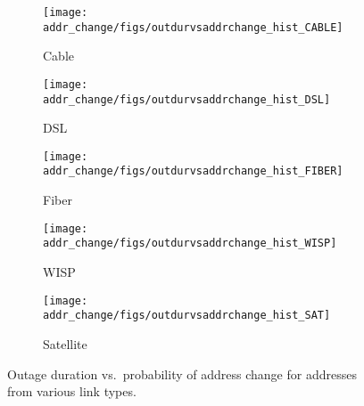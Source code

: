 
\begin{figure*}[t]

\begin{subfigure}[t]{0.19\linewidth}
\centering
\texttt{[image: addr\_change/figs/outdurvsaddrchange\_hist\_CABLE]}
\caption{
\label{fig:outdur_vs_addrchange_cable}
Cable}
\end{subfigure}
%
%
\begin{subfigure}[t]{0.19\linewidth}
\centering
\texttt{[image: addr\_change/figs/outdurvsaddrchange\_hist\_DSL]}
\caption{
\label{fig:outdur_vs_addrchange_dsl}
DSL}
\end{subfigure}
%
%
\begin{subfigure}[t]{0.19\linewidth}
\centering
\texttt{[image: addr\_change/figs/outdurvsaddrchange\_hist\_FIBER]}
\caption{
\label{fig:outdur_vs_addrchange_fiber}
Fiber}
\end{subfigure}
%
%
\begin{subfigure}[t]{0.19\linewidth}
\centering
\texttt{[image: addr\_change/figs/outdurvsaddrchange\_hist\_WISP]}
\caption{
\label{fig:outdur_vs_addrchange_wisp}
WISP}
\end{subfigure}
%
%
\begin{subfigure}[t]{0.19\linewidth}
\centering
\texttt{[image: addr\_change/figs/outdurvsaddrchange\_hist\_SAT]}
\caption{
\label{fig:outdur_vs_addrchange_sat}
Satellite}
\end{subfigure}
%
\caption{
\label{fig:outdur_vs_addrchange}	
\figdone
Outage duration vs.~probability of address change for addresses from
various link types.}
%
\end{figure*}

